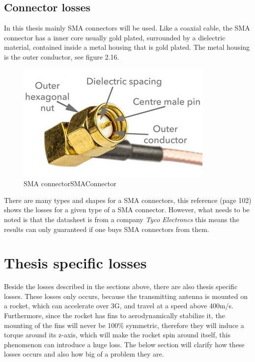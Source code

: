 \subsection{Connector losses}
In this thesis mainly SMA connectors will be used. Like a coaxial cable, the SMA connector has a inner core usually gold plated, surrounded by a dielectric material, contained inside a metal housing that is gold plated. The metal housing is the outer conductor, see figure 2.16. 

\begin{figure}[h!]
\centering
\includegraphics[scale=0.6]{figures/SMAConnector.jpg}
\caption{SMA connector{SMAConnector}}
\end{figure}

There are many types and shapes for a SMA connectors, this reference \cite{SMAConnectorLosses} (page 102) shows the losses for a given type of a SMA connector. However, what needs to be noted is that the datasheet is from a company \textit{Tyco Electroncs} this means the results can only guaranteed if one buys SMA connectors from them. 

\section{Thesis specific losses}
Beside the losses described in the sections above, there are also thesis specific losses. These losses only occurs, because the transmitting antenna is mounted on a rocket, which can accelerate over 3G, and travel at a speed above 400m/s. Furthermore, since the rocket has fins to aerodynamically stabilize it, the mounting of the fins will never be 100\% symmetric, therefore they will induce a torque around its z-axis, which will make the rocket spin around itself, this phenomenon can introduce a huge loss. The below section will clarify how these losses occurs and also how big of a problem they are.

